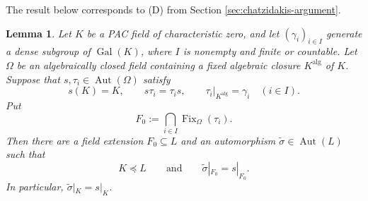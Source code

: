 \documentclass[10pt,a4paper]{amsart}
\newtheorem{lemma}[theorem]{Lemma}
\theoremstyle{definition}
\newcommand{\alg}{\mathrm{alg}}
\DeclareMathOperator{\Gal}{Gal}
\DeclareMathOperator{\Aut}{Aut}
\DeclareMathOperator{\Fix}{Fix}
\begin{document}
The result below corresponds to (D) from Section \ref{sec:chatzidakis-argument}.
\begin{lemma}\label{b:lem:completion}
Let $K$ be a PAC field of characteristic zero, and let
$(\gamma_i)_{i\in I}$ generate a dense subgroup of $\Gal(K)$,
where $I$ is nonempty and finite or countable. Let $\Omega$
be an algebraically closed field containing a fixed algebraic
closure $K^{\alg}$ of $K$. Suppose that $s,\tau_i\in\Aut(\Omega)$
satisfy
\[
s(K)=K,\qquad s\tau_i=\tau_i s,\qquad
\tau_i|_{K^{\alg}}=\gamma_i
\quad(i\in I).
\]
Put
\[
F_0:=\bigcap_{i\in I}\Fix_\Omega(\tau_i).
\]
Then there are a field extension $F_0\subseteq L$ and an
automorphism $\widetilde\sigma\in\Aut(L)$ such that
\[
K\preccurlyeq L
\qquad\text{and}\qquad
\widetilde\sigma|_{F_0}=s|_{F_0}.
\]
In particular, $\widetilde\sigma|_K=s|_K$.
\end{lemma}
\end{document}
